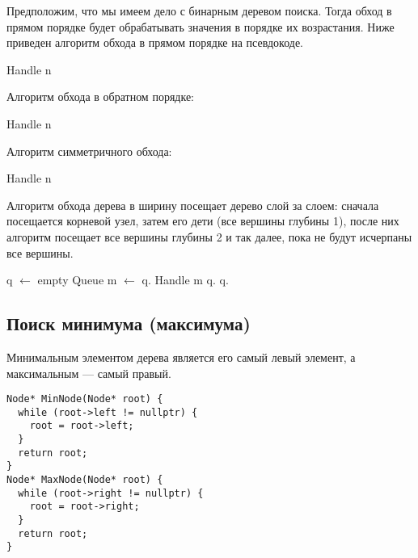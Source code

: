 Предположим, что мы имеем дело с бинарным деревом поиска. Тогда обход в прямом порядке будет обрабатывать значения
в порядке их возрастания. Ниже приведен алгоритм обхода в прямом порядке на псевдокоде.
\begin{algorithmic}
    \State Handle n
      \State {}
    \EndIf
      \State {}
    \EndIf
  \EndFunction
\end{algorithmic}

Алгоритм обхода в обратном порядке:
\begin{algorithmic}
      \State {}
    \EndIf
      \State {}
    \EndIf
    \State Handle n
  \EndFunction
\end{algorithmic}

Алгоритм симметричного обхода:
\begin{algorithmic}
      \State {}
    \EndIf
    \State Handle n
      \State {}
    \EndIf
  \EndFunction
\end{algorithmic}

Алгоритм обхода дерева в ширину посещает дерево слой за слоем: сначала посещается корневой узел,
затем его дети (все вершины глубины 1), после них алгоритм посещает все вершины глубины 2 и так
далее, пока не будут исчерпаны все вершины.
\begin{algorithmic}[1]
    \State q $\gets$ empty Queue
    \State {}
      \State m $\gets$ q.
      \State Handle m
        \State q.
      \EndIf
        \State q.
      \EndIf
    \EndWhile
  \EndFunction
\end{algorithmic}

\subsection{Поиск минимума (максимума)}
Минимальным элементом дерева является его самый левый элемент, а максимальным --- самый правый.
\begin{verbatim}
Node* MinNode(Node* root) {
  while (root->left != nullptr) {
    root = root->left;
  }
  return root;
}
Node* MaxNode(Node* root) {
  while (root->right != nullptr) {
    root = root->right;
  }
  return root;
}
\end{verbatim}

